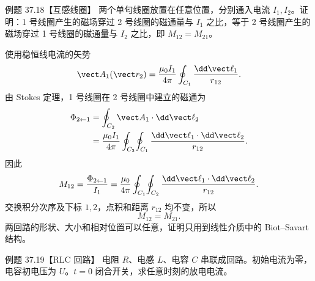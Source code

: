 \Needspace{0.12\textheight}
\begin{origexamplebox}{例题 37.18【互感线圈】}
两个单匂线圈放置在任意位置，分别通入电流 $I_1,I_2$。证明：1 号线圈产生的磁场穿过 2 号线圈的磁通量与 $I_1$ 之比，等于 2 号线圈产生的磁场穿过 1 号线圈的磁通量与 $I_2$ 之比，即 $M_{12}=M_{21}$。
\end{origexamplebox}

\begin{xesolution}
使用稳恒线电流的矢势
\begin{equation}
  \vect A_1(\vect r_2)=\frac{\mu_0I_1}{4\pi}
  \oint_{C_1}\frac{\dd\vect\ell_1}{r_{12}}.
\end{equation}
由 Stokes 定理，1 号线圈在 2 号线圈中建立的磁通为
\begin{align}
  \Phi_{2\leftarrow1}
  &=\oint_{C_2}\vect A_1\cdot\dd\vect\ell_2\\
  &=\frac{\mu_0I_1}{4\pi}\oint_{C_2}\!\oint_{C_1}
  \frac{\dd\vect\ell_1\cdot\dd\vect\ell_2}{r_{12}}.
\end{align}
因此
\begin{equation}
  M_{12}=\frac{\Phi_{2\leftarrow1}}{I_1}
  =\frac{\mu_0}{4\pi}\oint_{C_1}\!\oint_{C_2}
  \frac{\dd\vect\ell_1\cdot\dd\vect\ell_2}{r_{12}}.
\end{equation}
交换积分次序及下标 $1,2$，点积和距离 $r_{12}$ 均不变，所以
\begin{equation}
  \boxed{M_{12}=M_{21}}.
\end{equation}
两回路的形状、大小和相对位置可以任意，证明只用到线性介质中的 Biot--Savart 结构。

\mutualLoopsProofDiagram
\end{xesolution}

\Needspace{0.12\textheight}
\begin{origexamplebox}{例题 37.19【RLC 回路】}
电阻 $R$、电感 $L$、电容 $C$ 串联成回路。初始电流为零，电容初电压为 $U$。$t=0$ 闭合开关，求任意时刻的放电电流。
\end{origexamplebox}

